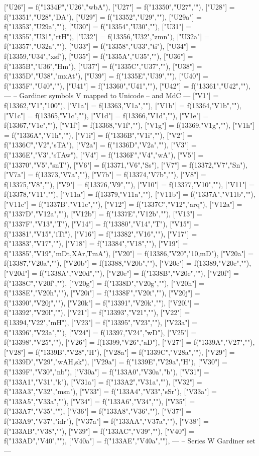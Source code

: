 \documentclass{article}
\begin{document}
\begin{luacode*}
{	["U26"] = f("1334F","U26","wbA"),
	["U27"] = f("13350","U27",""),
	["U28"] = f("13351","U28","DA"),
	["U29"] = f("13352","U29",""),
	["U29a"] = f("13353","U29a",""),
	["U30"] = f("13354","U30",""),
	["U31"] = f("13355","U31","rtH"),
	["U32"] = f(13356,"U32","zmn"),
	["U32a"] = f("13357","U32a",""),
	["U33"] = f("13358","U33","ti"),
	["U34"] = f(13359,"U34","xsf"),
	["U35"] = f("1335A","U35",""),
	["U36"] = f("1335B","U36","Hm"),
	["U37"] = f("1335C","U37",""),
	["U38"] = f("1335D","U38","mxAt"),
	["U39"] = f("1335E","U39",""),
	["U40"] = f("1335F","U40",""),
	["U41"] = f("13360","U41",""),
	["U42"] 	= f("13361","U42",""),
---
-- Gardiner symbols V mapped to Unicode
-- and MdC
---   
	["V1"] 	= f(13362,"V1","100"),
	["V1a"] 	= f(13363,"V1a",""),
   ["V1b"] 	= f(13364,"V1b",""),
   ["V1c"]	= f(13365,"V1c",""),
  	["V1d"]	= f(13366,"V1d",""),
  	["V1e"] 	= f(13367,"V1e",""),
  	["V1f"] 	= f(13368,"V1f",""),
  	["V1g"] 	= f(13369,"V1g",""),
  	["V1h"] 	= f("1336A","V1h",""),
  	["V1i"] 	= f("1336B","V1i",""),
	["V2"] 	= f("1336C","V2","sTA"),
	["V2a"] 	= f("1336D","V2a",""),
	["V3"] 	= f("1336E","V3","sTAw"),
	["V4"] 	= f("1336F","V4","wA"),
	["V5"] 	= f("13370","V5","snT"),
	["V6"] 	= f(13371,"V6","Ss"),
	["V7"] 	= f(13372,"V7","Sn"),
	["V7a"] 	= f(13373,"V7a",""),
	["V7b"] 	= f(13374,"V7b",""),
	["V8"] 	= f(13375,"V8",""),
	["V9"] 	= f(13376,"V9",""),
	["V10"] 	= f(13377,"V10",""),
	["V11"] 	= f(13378,"V11",""),
	["V11a"] 	= f(13379,"V11a",""),
	["V11b"] 	= f("1337A","V11b",""),
	["V11c"] 	= f("1337B","V11c",""),
	["V12"] 	= f("1337C","V12","arq"),	
	["V12a"] 	= f("1337D","V12a",""),
	["V12b"] 	= f("1337E","V12b",""),
	["V13"] 	= f("1337F","V13","T"),
	["V14"] 	= f("13380","V14","T"),
	["V15"] 	= f("13381","V15","iTi"),
	["V16"] 	= f("13382","V16",""),
	["V17"] 	= f("13383","V17",""),
	["V18"] 	= f("13384","V18",""),
	["V19"] 	= f("13385","V19","mDt,XAr,TmA"),
	["V20"] 	= f(13386,"V20","10,mD"),
	["V20a"] 	= f(13387,"V20a",""),
	["V20b"]	= f(13388,"V20b",""),
	["V20c"] 	= f(13389,"V20c",""),
	["V20d"] 	= f("1338A","V20d",""),
	["V20e"] 	= f("1338B","V20e",""),
	["V20f"] 	= f("1338C","V20f",""),
	["V20g"] 	= f("1338D","V20g",""),
	["V20h"] 	= f("1338E","V20h",""),
	["V20i"] 	= f("1338F","V20i",""),
	["V20j"] 	= f("13390","V20j",""),
	["V20k"] 	= f("13391","V20k",""),
	["V20l"] 	= f("13392","V20l",""),
	["V21"] 	= f("13393","V21",""),
	["V22"] = f(13394,"V22","mH"),
	["V23"] = f("13395","V23",""),
	["V23a"] = f("13396","V23a",""),
	["V24"] = f(13397,"V24","wD"),
	["V25"] = f("13398","V25",""),
	["V26"] = f(13399,"V26","aD"),
	["V27"] = f("1339A","V27",""),
	["V28"] = f("1339B","V28","H"),
	["V28a"] = f("1339C","V28a",""),
	["V29"] = f("1339D","V29","wAH,sk"),
	["V29a"] = f("1339E","V29a","H"),
	["V30"] = f("1339F","V30","nb"),
	["V30a"] = f("133A0","V30a","b"),
	["V31"] = f("133A1","V31","k"),
	["V31a"] = f("133A2","V31a",""),
	["V32"] = f("133A3","V32","msn"),
	["V33"] = f("133A4","V33","sSr"),
	["V33a"] = f("133A5","V33a",""),
	["V34"] = f("133A6","V34",""),
	["V35"] = f("133A7","V35",""),
	["V36"] = f("133A8","V36",""),
	["V37"] = f("133A9","V37","idr"),
	["V37a"] = f("133AA","V37a",""),
	["V38"] = f("133AB","V38",""),
	["V39"] = f("133AC","V39",""),
	["V40"] = f("133AD","V40",""),
	["V40a"] = f("133AE","V40a",""),
---
--  Series W Gardiner set
---

}
\end{luacode*}
\end{document}
